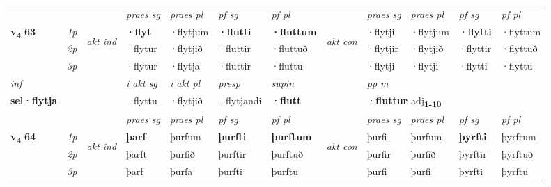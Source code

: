 \begin{longtable}[l]{X>{\footnotesize\itshape}llXXXXlXXXX}
 & &   & \textit{praes sg}  & \textit{praes pl}    & \textit{ pf sg} & \textit{pf pl} & & \textit{praes sg}  & \textit{praes pl}    & \textit{pf sg} & \textit{pf pl }  \\ \cmidrule{4-7} \cmidrule{9-12}
 \multirow{2}{*}{{{\textbf{v{\textsubscript{4}}} \Large{\textbf{63}}}}}  & 1p & \multirow{3}{*}{\begin{turn}{90}\textit{akt ind}\end{turn}} & \textbf{·flyt} & ·flytjum & \textbf{·flutti} & \textbf{·fluttum} & \multirow{3}{*}{\begin{turn}{90}\textit{akt con}\end{turn}} &·flytji & ·flytjum & \textbf{·flytti} & ·flyttum\\*
 & 2p &  &  ·flytur  & ·flytjið & ·fluttir & ·fluttuð & & ·flytjir & ·flytjið & ·flyttir & ·flyttuð \\*
 & 3p &  & ·flytur & ·flytja & ·fluttir & ·fluttu & & ·flytji & ·flytji& ·flytti & ·flyttu \\*
\cmidrule{4-7} \cmidrule{9-12}

   {\textit{inf}} & &  & \textit{i akt sg} & \textit{i akt pl}   & \textit{presp} & \textit{supin}  && \textit{pp m} \\*
  {\textbf{sel\allowbreak ·flytja}} & && ·flyttu  & ·flytjið   & ·flytjandi &  \textbf{·flutt}  && \multicolumn{2}{l}{\textbf{·fluttur} adj\textbf{\textsubscript{1-10}}} \\*

\midrule

 & &   & \textit{praes sg}  & \textit{praes pl}    & \textit{ pf sg} & \textit{pf pl} & & \textit{praes sg}  & \textit{praes pl}    & \textit{pf sg} & \textit{pf pl }  \\ \cmidrule{4-7} \cmidrule{9-12}
 \multirow{2}{*}{{{\textbf{v{\textsubscript{4}}} \Large{\textbf{64}}}}}  & 1p & \multirow{3}{*}{\begin{turn}{90}\textit{akt ind}\end{turn}} & \textbf{þarf} & þurfum & \textbf{þurfti} & \textbf{þurftum} & \multirow{3}{*}{\begin{turn}{90}\textit{akt con}\end{turn}} &þurfi & þurfum & \textbf{þyrfti} & þyrftum\\*
 & 2p &  &  þarft  & þurfið & þurftir & þurftuð & & þurfir & þurfið & þyrftir & þyrftuð \\*
 & 3p &  & þarf & þurfa & þurfti & þurftu & & þurfi & þurfi& þyrfti & þyrftu \\*
\cmidrule{4-7} \cmidrule{9-12}


\end{longtable}
